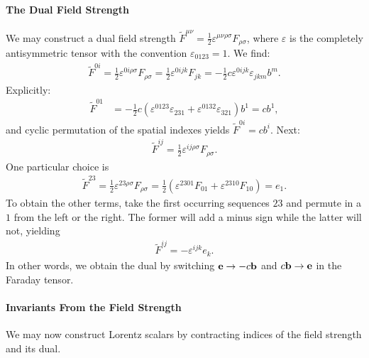 \paragraph{The Dual Field Strength}
We may construct a dual field strength $\tilde{F}^{\mu\nu} = \frac{1}{2}\varepsilon^{\mu\nu\rho\sigma}F_{\rho\sigma}$, where $\varepsilon$ is the completely antisymmetric tensor with the convention $\varepsilon_{0123} = 1$. We find:
\begin{align*}
	\tilde{F}^{0i} = \frac{1}{2}\varepsilon^{0i\rho\sigma}F_{\rho\sigma} = \frac{1}{2}\varepsilon^{0ijk}F_{jk} = -\frac{1}{2}c\varepsilon^{0ijk}\varepsilon_{jkm}b^{m}.
\end{align*}
Explicitly:
\begin{align*}
	\tilde{F}^{01} &= -\frac{1}{2}c(\varepsilon^{0123}\varepsilon_{231} + \varepsilon^{0132}\varepsilon_{321})b^{1} = cb^{1},
\end{align*}
and cyclic permutation of the spatial indexes yields $\tilde{F}^{0i} = cb^{i}$. Next:
\begin{align*}
	\tilde{F}^{ij} = \frac{1}{2}\varepsilon^{ij\rho\sigma}F_{\rho\sigma}.
\end{align*}
One particular choice is
\begin{align*}
	\tilde{F}^{23} = \frac{1}{2}\varepsilon^{23\rho\sigma}F_{\rho\sigma} = \frac{1}{2}(\varepsilon^{2301}F_{01} + \varepsilon^{2310}F_{10}) = e_{1}.
\end{align*}
To obtain the other terms, take the first occurring sequences $23$ and permute in a $1$ from the left or the right. The former will add a minus sign while the latter will not, yielding
\begin{align*}
	\tilde{F}^{ij} = -\varepsilon^{ijk}e_{k}.
\end{align*}
In other words, we obtain the dual by switching $\vb{e} \to -c\vb{b}$ and $c\vb{b} \to \vb{e}$ in the Faraday tensor.

\paragraph{Invariants From the Field Strength}
We may now construct Lorentz scalars by contracting indices of the field strength and its dual.

